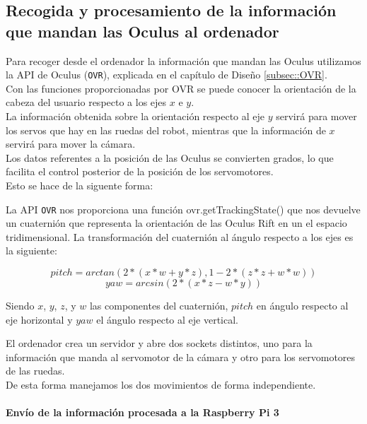 \documentclass[twoside, 11pt]{epstfg}
\begin{document}
\subsection{Recogida y procesamiento de la información que mandan las Oculus al ordenador}

Para recoger desde el ordenador la información que mandan las Oculus utilizamos la API de Oculus (\texttt{OVR}), explicada en el capítulo de Diseño \ref{subsec::OVR}.\\
Con las funciones proporcionadas por OVR se puede conocer la orientación de la cabeza del usuario respecto a los ejes $x$ e $y$.\\
La información obtenida sobre la orientación respecto al eje $y$ servirá para mover los servos que hay en las ruedas del robot, mientras que la información de $x$ servirá para mover la cámara.\\
Los datos referentes a la posición de las Oculus se convierten grados, lo que facilita el control posterior de la posición de los servomotores.\\ Esto se hace de la siguente forma:

La API \texttt{OVR} nos proporciona una función  ovr.getTrackingState() que nos devuelve un cuaternión que representa la orientación de las Oculus Rift en un el espacio tridimensional. La transformación del cuaternión al ángulo respecto a los ejes es la siguiente:


$$  pitch = arctan(2 * (x*w + y*z), 1 - 2 * (z*z + w*w))$$
$$  yaw = arcsin(2 * (x*z - w*y))$$

Siendo $x$, $y$, $z$, y $w$ las componentes del cuaternión, $pitch$ en ángulo respecto al eje horizontal y $yaw$ el ángulo respecto al eje vertical.


El ordenador crea un servidor y abre dos sockets distintos, uno para la información que manda al servomotor de la cámara y otro para los servomotores de las ruedas.\\
De esta forma manejamos los dos movimientos de forma independiente.



\paragraph{Envío de la información procesada a la Raspberry Pi 3}
\end{document}
